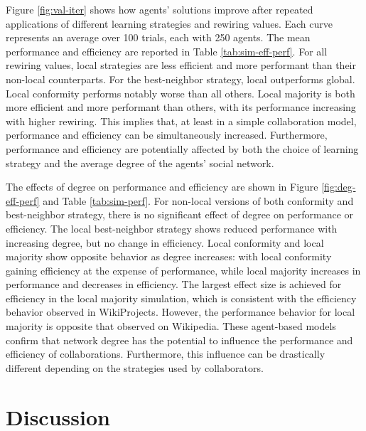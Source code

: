 Figure \ref{fig:val-iter} shows how agents' solutions improve after repeated applications of
different learning strategies and rewiring values.
Each curve represents an average over 100 trials, each with 250 agents.
The mean performance and efficiency are reported in Table \ref{tab:sim-eff-perf}.
For all rewiring values, local strategies are less efficient and more performant
than their non-local counterparts.
For the best-neighbor strategy, local outperforms global.
Local conformity performs notably worse than all others.
Local majority is both more efficient and more performant than others,
with its performance increasing with higher rewiring.
This implies that,
at least in a simple collaboration model,
performance and efficiency can be simultaneously increased.
Furthermore, performance and efficiency are potentially affected by both the choice of
learning strategy and the average degree of the agents' social network.

The effects of degree on performance and efficiency are shown in Figure \ref{fig:deg-eff-perf} and
Table \ref{tab:sim-perf}.
For non-local versions of both conformity and best-neighbor strategy,
there is no significant effect of degree on performance or efficiency.
The local best-neighbor strategy shows reduced performance with increasing degree,
but no change in efficiency.
Local conformity and local majority show opposite behavior as degree increases:
with local conformity gaining efficiency at the expense of performance,
while local majority increases in performance and decreases in efficiency.
The largest effect size is achieved for efficiency in the local majority simulation,
which is consistent with the efficiency behavior observed in WikiProjects.
However, the performance behavior for local majority is opposite that observed on
Wikipedia.
These agent-based models confirm that network degree has the potential to influence
the performance and efficiency of collaborations.
Furthermore, this influence can be drastically different depending on the strategies
used by collaborators.

\section{Discussion}
\label{sec:discuss}

